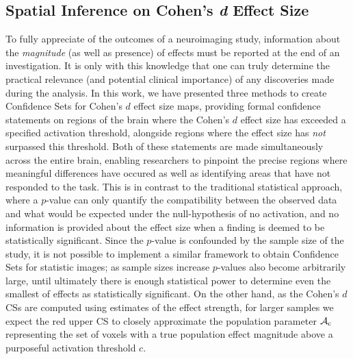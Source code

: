 \subsection{Spatial Inference on Cohen's \textit{d} Effect Size}
To fully appreciate of the outcomes of a neuroimaging study, information about the \textit{magnitude} (as well as presence) of effects must be reported at the end of an investigation. It is only with this knowledge that one can truly determine the practical relevance (and potential clinical importance) of any discoveries made during the analysis. In this work, we have presented three methods to create Confidence Sets for Cohen's $d$ effect size maps, providing formal confidence statements on regions of the brain where the Cohen's $d$ effect size has exceeded a specified activation threshold, alongside regions where the effect size has \textit{not} surpassed this threshold. Both of these statements are made simultaneously across the entire brain, enabling researchers to pinpoint the precise regions where meaningful differences have occured as well as identifying areas that have not responded to the task. This is in contrast to the traditional statistical approach, where a $p$-value can only quantify the compatibility between the observed data and what would be expected under the null-hypothesis of no activation, and no information is provided about the effect size when a finding is deemed to be statistically significant. Since the $p$-value is confounded by the sample size of the study, it is not possible to implement a similar framework to obtain Confidence Sets for statistic images; as sample sizes increase $p$-values also become arbitrarily large, until ultimately there is enough statistical power to determine even the smallest of effects as statistically significant. On the other hand, as the Cohen's $d$ CSs are computed using estimates of the effect strength, for larger samples we expect the red upper CS to closely approximate the population parameter $\operatorname{\mathcal{A}_{c}}$ representing the set of voxels with a true population effect magnitude above a purposeful activation threshold $c$.

